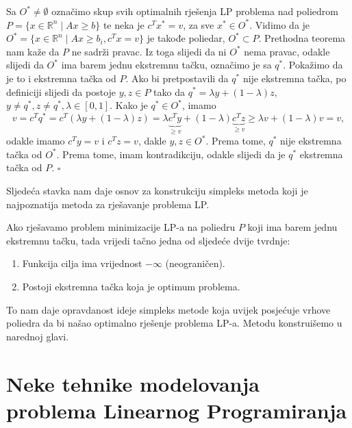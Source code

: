 \documentclass[a4paper, utf8, 11pt, colorlinks]{book}
\newtheorem{thm}{Teorema}
\newenvironment{proof}{{Dokaz:}}{\hfill$\square$}
\begin{document}
\begin{proof}
         Sa $O^* \not = \emptyset$ označimo skup svih optimalnih rješenja LP problema nad poliedrom $P= \{ x \in \mathbb{R}^n \mid A x \geq b \}$ te neka je $c^T x^* = v$, za sve $x^* \in O^*$. Vidimo da je 
         $O^* = \{ x \in \mathbb{R}^n \mid A x \geq b_i, c^T x = v  \}$ je takođe poliedar, $O^* \subset P$. Prethodna teorema nam kaže da $P$ ne sadrži pravac. Iz toga slijedi da ni $O^*$ nema pravac, odakle slijedi da $O^*$ ima barem jednu ekstremnu tačku, označimo je sa $q^*$. Pokažimo da je to i ekstremna tačka od $P$.  Ako bi pretpostavili da $q^*$ nije ekstremna tačka, po definiciji slijedi da postoje $y, z \in P$ tako da $q^* = \lambda y + ( 1 - \lambda ) z $, $y \neq q^*, z \neq q^*, \lambda \in [0, 1]$. Kako je $q^* \in O^*$, imamo 
         $$ v = c^T q^* = c^T (  \lambda y + ( 1 - \lambda ) z ) = \lambda 
        \underbrace{ c^T y}_{ \geq v} + ( 1 - \lambda ) \underbrace{c^T z}_{\geq v} \geq \lambda v + (1 - \lambda) v = v,$$
        odakle imamo $c^T y = v$ i $c^T z = v$, dakle $y, z \in O^*$. Prema tome, $q^*$ nije ekstremna tačka od $O^*$. Prema tome, imam kontradikciju, odakle slijedi da je $q^*$  ekstremna tačka od  $P$.
\end{proof}
 
 Sljedeća stavka nam daje osnov za konstrukciju simpleks metoda koji je najpoznatija metoda za rješavanje problema LP.
 
 Ako  rješavamo problem minimizacije LP-a na poliedru $P$ koji ima barem jednu ekstremnu tačku, tada vrijedi tačno jedna od sljedeće dvije tvrdnje:
   \begin{enumerate}
       \item Funkcija cilja ima vrijednost $- \infty$ (neograničen).
       \item Postoji ekstremna tačka koja je optimum problema. 
   \end{enumerate}
To nam daje opravdanost ideje simpleks metode koja uvijek posjećuje vrhove poliedra 
da bi našao optimalno rješenje problema LP-a. Metodu konstruišemo u narednoj glavi.

\section{Neke tehnike modelovanja problema Linearnog Programiranja}
\end{document}

